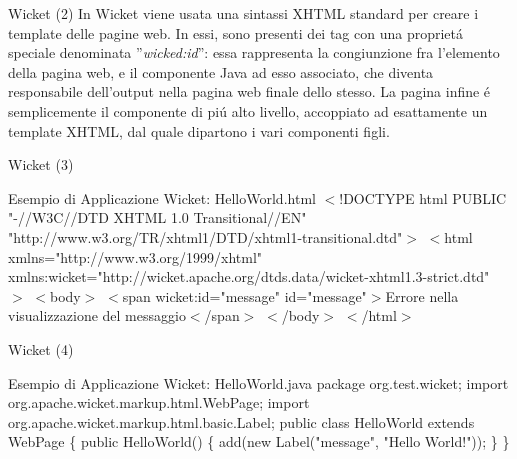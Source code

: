 \documentclass{beamer}
\begin{document}
\begin{frame}{Wicket (2)}
In Wicket viene usata una sintassi XHTML standard per creare i template delle pagine web. In essi, sono presenti dei tag con una
propriet\'a speciale denominata ''\emph{wicked:id}'': essa rappresenta la congiunzione fra l'elemento della pagina web, e il
componente Java ad esso associato, che diventa responsabile dell'output nella pagina web finale dello stesso.
 La pagina infine \'e semplicemente il componente di pi\'u alto livello, accoppiato ad esattamente un template XHTML, dal quale
dipartono i vari componenti figli.
\end{frame}

\begin{frame}{Wicket (3)}
\begin{exampleblock}{Esempio di Applicazione Wicket: HelloWorld.html}
{\small
$<$!DOCTYPE html PUBLIC "-//W3C//DTD XHTML 1.0 Transitional//EN" 
\newline
\hspace*{5 mm} "http://www.w3.org/TR/xhtml1/DTD/xhtml1-transitional.dtd"$>$
\newline
$<$html xmlns="http://www.w3.org/1999/xhtml" 
\newline
\hspace*{5 mm} xmlns:wicket="http://wicket.apache.org/dtds.data/wicket-xhtml1.3-strict.dtd" $>$
\newline
$<$body$>$
\newline
\hspace*{5 mm}$<$span wicket:id="message" id="message"$>$Errore nella visualizzazione del messaggio$<$/span$>$
\newline
$<$/body$>$
\newline
$<$/html$>$
}
\end{exampleblock}
\end{frame}

\begin{frame}{Wicket (4)}
\begin{exampleblock}{Esempio di Applicazione Wicket: HelloWorld.java}
{\small
package org.test.wicket;
\newline
import org.apache.wicket.markup.html.WebPage;
\newline
import org.apache.wicket.markup.html.basic.Label;
\newline
public class HelloWorld extends WebPage \{
\newline
\hspace*{5 mm}public HelloWorld() \{
\newline
\hspace*{10 mm} add(new Label("message", "Hello World!"));
\newline
\hspace*{5 mm}\}
\newline
\}
\newline
}
\end{exampleblock}
\end{frame}
\end{document}
